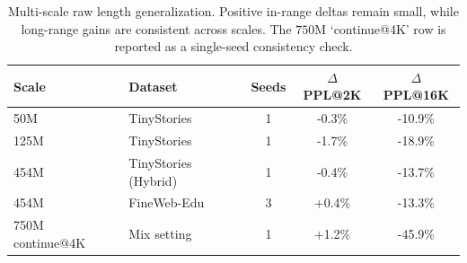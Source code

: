 \begin{table}[t]
\caption{Multi-scale raw length generalization. Positive in-range deltas remain small, while long-range gains are consistent across scales. The \(750\mathrm{M}\) `continue@4K' row is reported as a single-seed consistency check.}
\label{tab:multiscale}
\centering
\small
\begin{tabular}{@{}l l c c c@{}}
\toprule
Scale & Dataset & Seeds & $\Delta$PPL@2K & $\Delta$PPL@16K \\
\midrule
50M & TinyStories & 1 & -0.3\% & -10.9\% \\
125M & TinyStories & 1 & -1.7\% & -18.9\% \\
454M & TinyStories (Hybrid) & 1 & -0.4\% & -13.7\% \\
454M & FineWeb-Edu & 3 & +0.4\% & -13.3\% \\
750M continue@4K & Mix setting & 1 & +1.2\% & -45.9\% \\
\bottomrule
\end{tabular}
\end{table}
